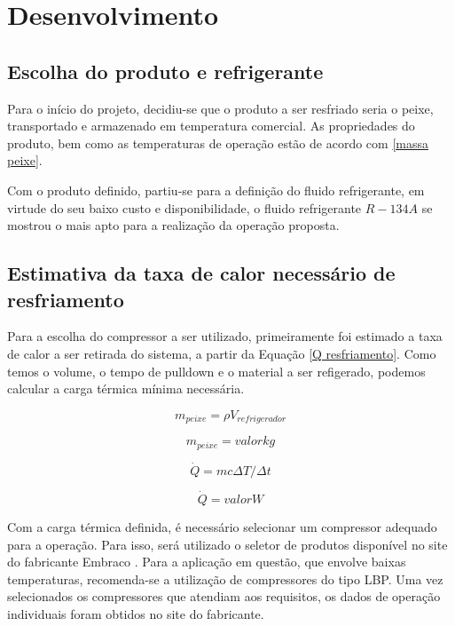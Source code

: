 \chapter{Desenvolvimento}

\section{Escolha do produto e refrigerante}

    Para o início do projeto, decidiu-se que o produto a ser resfriado seria o peixe, transportado e armazenado em temperatura comercial. As propriedades do produto, bem como as temperaturas de operação estão de acordo com \ref{massa peixe}. 

    Com o produto definido, partiu-se para a definição do fluido refrigerante, em virtude do seu baixo custo e disponibilidade, o fluido refrigerante $R-134A$ se mostrou o mais apto para a realização da operação proposta.

\section{Estimativa da taxa de calor necessário de resfriamento}

    Para a escolha do compressor a ser utilizado, primeiramente foi estimado a taxa de calor a ser retirada do sistema, a partir da Equação \ref{Q resfriamento}. Como temos o volume, o tempo de pulldown e o material a ser refigerado, podemos calcular a carga térmica mínima necessária.

\begin{equation}
    m_{peixe} = \rho V_{refrigerador}
    \label{massa peixe}
\end{equation}

\begin{equation}
    m_{peixe} =  valor kg
\end{equation}

\begin{equation}
    \dot{Q} = m c \Delta T / \Delta t
    \label{Q resfriamento}
\end{equation}

\begin{equation}
    \dot{Q} = valor W
\end{equation}
    
Com a carga térmica definida, é necessário selecionar um compressor adequado para a operação. Para isso, será utilizado o seletor de produtos disponível no site do fabricante Embraco \textcopyright. Para a aplicação em questão, que envolve baixas temperaturas, recomenda-se a utilização de compressores do tipo LBP. Uma vez selecionados os compressores que atendiam aos requisitos, os dados de operação individuais foram obtidos no site do fabricante.


